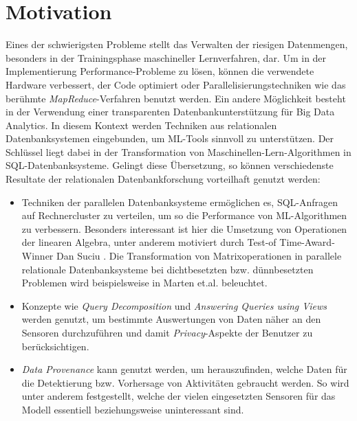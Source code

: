 \section*{Motivation}
Eines der schwierigsten Probleme stellt das Verwalten der riesigen Datenmengen, besonders in der Trainingsphase maschineller Lernverfahren, dar. Um in der Implementierung Performance-Probleme zu lösen, können die verwendete Hardware verbessert, der Code optimiert oder Parallelisierungstechniken wie das berühmte \textit{MapReduce}-Verfahren\cite{DBLP:journals/cn/BrinP98} benutzt werden. Ein andere Möglichkeit besteht in der Verwendung einer transparenten Datenbankunterstützung\cite{DBLP:conf/gvd/MartenH15} für Big Data Analytics. In diesem Kontext werden Techniken aus relationalen Datenbanksystemen eingebunden, um ML-Tools sinnvoll zu unterstützen.
Der Schlüssel liegt dabei in der Transformation von Maschinellen-Lern-Algorithmen in SQL-Datenbanksysteme. Gelingt diese Übersetzung, so können verschiedenste Resultate der relationalen Datenbankforschung vorteilhaft genutzt werden:
\begin{itemize}
    \item Techniken der parallelen Datenbanksysteme ermöglichen es, SQL-Anfragen auf Rechnercluster zu verteilen, um so die Performance von ML-Algorithmen zu verbessern. Besonders interessant ist hier die Umsetzung von Operationen der linearen Algebra, unter anderem motiviert durch Test-of Time-Award-Winner Dan Suciu \cite{interviewsuciu}. Die Transformation von Matrixoperationen in parallele relationale Datenbanksysteme bei dichtbesetzten bzw. dünnbesetzten Problemen wird beispielsweise in Marten et.al.\cite{martensparse} beleuchtet.
    \item Konzepte wie \textit{Query Decomposition} \cite{chirkova2011materialized} und \textit{Answering Queries using Views} \cite{ afrati2019answering, levy1999answering} werden genutzt, um bestimmte Auswertungen von Daten näher an den Sensoren durchzuführen und damit \textit{Privacy}-Aspekte \cite{agrawal2000privacy} der Benutzer zu berücksichtigen.
    \item \textit{Data Provenance} \cite{heuer2015metis, bruder2017konzepte} kann genutzt werden, um herauszufinden, welche Daten für die Detektierung bzw. Vorhersage von Aktivitäten gebraucht werden. 
    So wird unter anderem festgestellt, welche der vielen eingesetzten Sensoren für das Modell essentiell beziehungsweise uninteressant sind.
\end{itemize}

